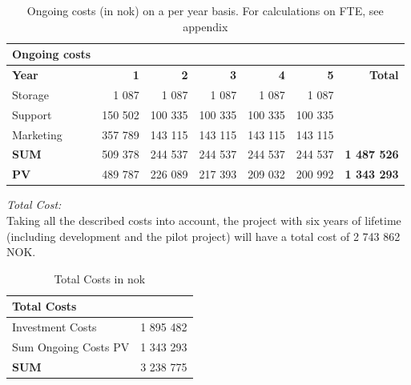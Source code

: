 \begin{table}
\centering
    \begin{tabular}{|l|r|r|r|r|r|r|}
        \hline
       \textbf{Ongoing costs}  & & & & & & \\ \hline
      \textbf{Year} & \textbf{1} & \textbf{2} & \textbf{3} & \textbf{4} & \textbf{5} & \textbf{Total}\\ \hline
	   Storage & 1 087 & 1 087 & 1 087 & 1 087 & 1 087 &\\ \hline
	  Support & 150 502 & 100 335 & 100 335 & 100 335 & 100 335 & \\ \hline
	  Marketing & 357 789 & 143 115 & 143 115 & 143 115 & 143 115 & \\ \hline
	   \textbf{SUM} & 509 378 & 244 537 & 244 537 & 244 537 & 244 537 & \textbf{1 487 526} \\ \hline  
	   \textbf{PV} & 489 787 & 226 089 & 217 393 & 209 032 & 200 992 & \textbf{1 343 293}  \\ \hline
    \end{tabular}
    \caption[Ongoing costs on a per year basis]{Ongoing costs (in \ac{nok}) on a per year basis. For calculations on FTE, see appendix}
    \label{tab:ongoing}
\end{table}
\emph{Total Cost:}\\
Taking all the described costs into account, the project with six years of lifetime (including development and the pilot project) will have a total cost of 2 743 862 NOK.

\begin{table}[h]
\centering
\begin{tabular}{|l|r|}
\hline
\textbf{Total Costs} & \\ \hline
Investment Costs & 1 895 482 \\ \hline
Sum Ongoing Costs PV & 1 343 293 \\ \hline
\textbf{SUM} & 3 238 775 \\ \hline
\end{tabular}
\caption[Total Costs]{Total Costs in \ac{nok}}
\label{tab:totalcosts}
\end{table}

